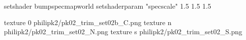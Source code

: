 setshader bumpspecmapworld
setshaderparam "specscale" 1.5 1.5 1.5

texture 0 philipk2/pk02_trim_set02b_C.png
texture n philipk2/pk02_trim_set02_N.png
texture s philipk2/pk02_trim_set02_S.png

